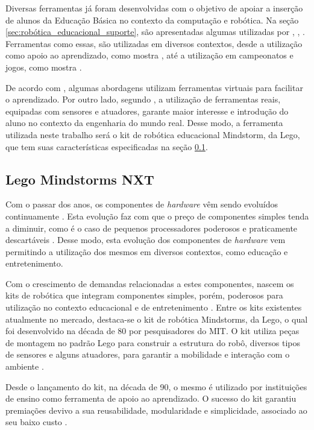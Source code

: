 Diversas ferramentas já foram desenvolvidas com o objetivo de apoiar a inserção de alunos da Educação Básica no contexto da computação e robótica. Na seção \ref{sec:robótica_educacional_suporte}, são apresentadas algumas utilizadas por \cite{analiseFerramentaEnsinoComputacao}, \cite{projetoRoboticaMauricio}, \cite{simpleRobotsIntroductionEng}. Ferramentas como essas, são utilizadas em diversos contextos, desde a utilização como apoio ao aprendizado, como mostra \cite{teachingWithRoboticKit}, até a utilização em campeonatos e jogos, como mostra \cite{ciber-rato}.

De acordo com \cite{analiseFerramentaEnsinoComputacao}, algumas abordagens utilizam ferramentas virtuais para facilitar o aprendizado. Por outro lado, segundo \cite{simpleMobile}, a utilização de ferramentas reais, equipadas com sensores e atuadores, garante maior interesse e introdução do aluno no contexto da engenharia do mundo real. Desse modo, a ferramenta utilizada neste trabalho será o kit de robótica educacional Mindstorm, da Lego, que tem suas características especificadas na seção \ref{sub:kit_mindstorm}.

\subsection{Lego Mindstorms NXT} %
\label{sub:kit_mindstorm}

Com o passar dos anos, os componentes de \textit{hardware} vêm sendo evoluídos continuamente \cite{teachingWithRoboticKit}. Esta evolução faz com que o preço de componentes simples tenda a diminuir, como é o caso de pequenos processadores poderosos e praticamente descartáveis \cite{teachingWithRoboticKit}. Desse modo, esta evolução dos componentes de \textit{hardware} vem permitindo a utilização dos mesmos em diversos contextos, como educação e entretenimento.

Com o crescimento de demandas relacionadas a estes componentes, nascem os kits de robótica que integram componentes simples, porém, poderosos para utilização no contexto educacional e de entretenimento \cite{teachingWithRoboticKit}. Entre os kits existentes atualmente no mercado, destaca-se o kit de robótica Mindstorms, da Lego, o qual foi desenvolvido na década de 80 por pesquisadores do MIT. O kit utiliza peças de montagem no padrão Lego para construir a estrutura do robô, diversos tipos de sensores e alguns atuadores, para garantir a mobilidade e interação com o ambiente \cite{teachingWithRoboticKit}.

Desde o lançamento do kit, na década de 90, o mesmo é utilizado por instituições de ensino como ferramenta de apoio ao aprendizado. O sucesso do kit garantiu premiações devivo a sua reusabilidade, modularidade e simplicidade, associado ao seu baixo custo \cite{teachingWithRoboticKit}.

